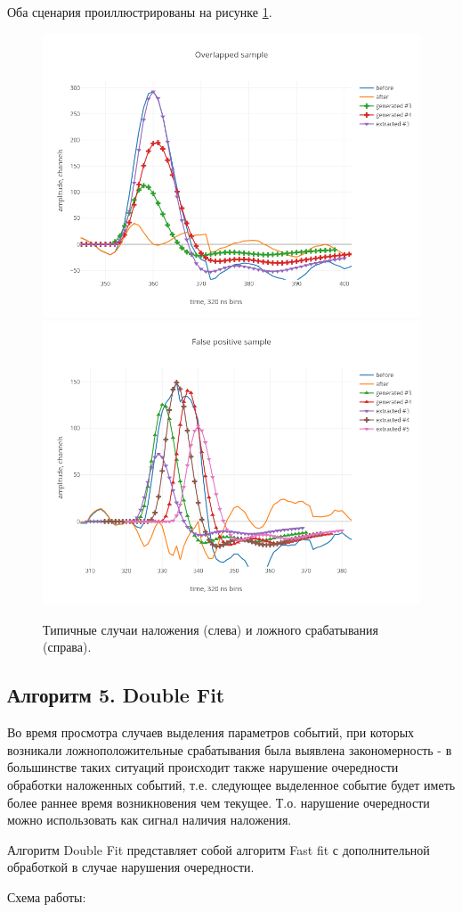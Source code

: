 \documentclass[a4paper,14pt]{extreport}
\begin{document}
Оба сценария проиллюстрированы на рисунке \ref{method-4-artifacts}.
\begin{figure}
\centering
	\includegraphics[width=0.40\linewidth]{img/signals/artifacts/overlap.png}
    \includegraphics[width=0.40\linewidth]{img/signals/artifacts/false_positive.png}
    \caption{Типичные случаи наложения (слева) и ложного срабатывания (справа). }
    \label{method-4-artifacts}
\end{figure}

\subsection{Алгоритм 5. Double Fit}
Во время просмотра случаев выделения параметров событий, при которых возникали ложноположительные срабатывания была выявлена закономерность - в большинстве таких ситуаций происходит также нарушение очередности обработки наложенных событий, т.е. следующее выделенное событие будет иметь более раннее время возникновения чем текущее. Т.о. нарушение очередности можно использовать как сигнал наличия наложения.

Алгоритм Double Fit представляет собой алгоритм Fast fit с дополнительной обработкой в случае нарушения очередности.

Схема работы:
\end{document}
